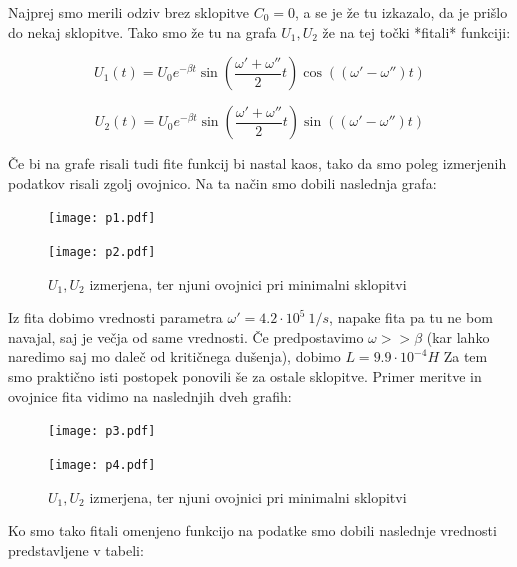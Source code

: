 \documentclass[12pt]{article}
\begin{document}
Najprej smo merili odziv brez sklopitve $C_0 = 0$, a se je že tu izkazalo, da je prišlo do nekaj sklopitve. Tako smo že tu na grafa $U_1, U_2$ že na tej točki *fitali* funkciji:

$$U_1(t) = U_0 e^{-\beta t} \sin \left(\frac{\omega ' + \omega''}{2}t\right)\cos\left((\omega'-\omega'')t\right)$$

$$U_2(t) = U_0 e^{-\beta t} \sin \left(\frac{\omega ' + \omega''}{2}t\right)\sin\left((\omega'-\omega'')t\right)$$

Če bi na grafe risali tudi fite funkcij bi nastal kaos, tako da smo poleg izmerjenih podatkov risali zgolj ovojnico. Na ta način smo dobili naslednja grafa:
\newpage

\begin{figure}[h]
\centering
\begin{minipage}[t]{0.45\textwidth}
    \texttt{[image: p1.pdf]}

\end{minipage}
\hfill
\begin{minipage}[t]{0.45\textwidth}
    \texttt{[image: p2.pdf]}

\end{minipage}
\caption{$U_1, U_2$ izmerjena, ter njuni ovojnici pri minimalni sklopitvi}
\end{figure}

Iz fita dobimo vrednosti parametra $\omega' = 4.2\cdot 10^5 \ 1/s$, napake fita pa tu ne bom navajal, saj je večja od same vrednosti. Če predpostavimo $\omega >> \beta$ (kar lahko naredimo saj mo daleč od kritičnega dušenja), dobimo $L = 9.9\cdot 10^{-4} H$ Za tem smo praktično isti postopek ponovili še za ostale sklopitve. Primer meritve in ovojnice fita vidimo na naslednjih dveh grafih:

\begin{figure}[h]
\centering
\begin{minipage}[t]{0.45\textwidth}
    \texttt{[image: p3.pdf]}

\end{minipage}
\hfill
\begin{minipage}[t]{0.45\textwidth}
    \texttt{[image: p4.pdf]}

\end{minipage}
\caption{$U_1, U_2$ izmerjena, ter njuni ovojnici pri minimalni sklopitvi}
\end{figure}
Ko smo tako fitali omenjeno funkcijo na podatke smo dobili naslednje vrednosti predstavljene v tabeli:
\end{document}
